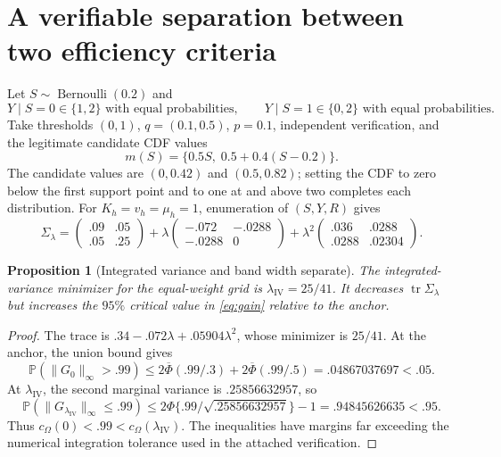 \documentclass[11pt]{article}
\newtheorem{proposition}[theorem]{Proposition}
\theoremstyle{remark}\newtheorem{remark}[theorem]{Remark}
\newcommand{\Pp}{\mathbb P}
\newcommand{\tr}{\operatorname{tr}}
\begin{document}
\section{A verifiable separation between two efficiency criteria}
Let $S\sim\operatorname{Bernoulli}(0.2)$ and
\[
 Y\mid S=0\in\{1,2\}\text{ with equal probabilities},\qquad
 Y\mid S=1\in\{0,2\}\text{ with equal probabilities}.
\]
Take thresholds $(0,1)$, $q=(0.1,0.5)$, $p=0.1$, independent verification, and the legitimate candidate CDF values
\[
 m(S)=\{0.5S,\;0.5+0.4(S-0.2)\}.
\]
The candidate values are $(0,0.42)$ and $(0.5,0.82)$; setting the CDF to zero below the first support point and to one at and above two completes each distribution.
For $K_h=v_h=\mu_h=1$, enumeration of $(S,Y,R)$ gives
\begin{equation}
 \Sigma_\lambda=
 \begin{pmatrix}.09&.05\\.05&.25\end{pmatrix}
 +\lambda\begin{pmatrix}-.072&-.0288\\-.0288&0\end{pmatrix}
 +\lambda^2\begin{pmatrix}.036&.0288\\.0288&.02304\end{pmatrix}.
 \label{eq:examplecov}
\end{equation}
\begin{proposition}[Integrated variance and band width separate]\label{prop:separation}
The integrated-variance minimizer for the equal-weight grid is $\lambda_{\mathrm{IV}}=25/41$. It decreases $\tr\Sigma_\lambda$ but increases the $95\%$ critical value in \eqref{eq:gain} relative to the anchor.
\end{proposition}
\begin{proof}
The trace is $.34-.072\lambda+.05904\lambda^2$, whose minimizer is $25/41$.
At the anchor, the union bound gives
\[
 \Pp(\|G_0\|_\infty>.99)
 \leq2\overline\Phi(.99/.3)+2\overline\Phi(.99/.5)
 =.04867037697<.05.
\]
At $\lambda_{\mathrm{IV}}$, the second marginal variance is $.25856632957$, so
\[
 \Pp(\|G_{\lambda_{\mathrm{IV}}}\|_\infty\leq.99)
 \leq2\Phi\{.99/\sqrt{.25856632957}\}-1
 =.94845626635<.95.
\]
Thus $c_\Omega(0)<.99<c_\Omega(\lambda_{\mathrm{IV}})$. The inequalities have margins far exceeding the numerical integration tolerance used in the attached verification.
\end{proof}
\end{document}
